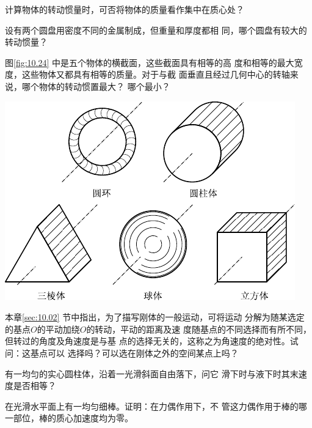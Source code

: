 \begin{questions}

\question 计算物体的转动惯量时，可否将物体的质量看作集中在质心处？

\question 设有两个圆盘用密度不同的金属制成，但重量和厚度都相
同，哪个圆盘有较大的转动惯量？

\question 图\ref{fig:10.24} 中是五个物体的横截面，这些截面具有相等的高
度和相等的最大宽度，这些物体又都具有相等的质量。对于与截
面垂直且经过几何中心的转轴来说，哪个物体的转动惯置最大？
哪个最小？

\vspace{1.5em}
\begin{figurex}
    \centering
    \includegraphics{figure/fig10.24}
    \caption{}
    \label{fig:10.24}
\end{figurex}
\vspace{1.5em}

\question 本章\ref{sec:10.02} 节中指出，为了描写刚体的一般运动，可将运动
分解为随某选定的基点$ O $的平动加绕$ O $的转动，平动的距离及速
度随基点的不同选择而有所不同，但转过的角度及角速度是与基
点的选择无关的，这称之为角速度的绝对性。试问：这基点可以
选择吗？可以选在刚体之外的空间某点上吗？

\question 有一均匀的实心圆柱体，沿着一光滑斜面自由落下，问它
滑下时与液下时其末速度是否相等？

\question 在光滑水平面上有一均匀细棒。证明：在力偶作用下，不
管这力偶作用于棒的哪一部位，棒的质心加速度均为零。

\end{questions}
